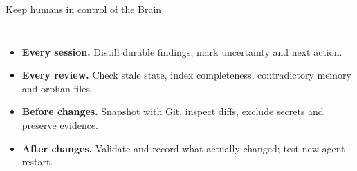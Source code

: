 \begin{frame}{Keep humans in control of the Brain}
\begin{columns}[c,onlytextwidth]
\begin{itemize}\setlength{\itemsep}{.48em}\small
\item \textbf{Every session.} Distill durable findings; mark uncertainty and next action.
\item \textbf{Every review.} Check stale state, index completeness, contradictory memory and orphan files.
\item \textbf{Before changes.} Snapshot with Git, inspect diffs, exclude secrets and preserve evidence.
\item \textbf{After changes.} Validate and record what actually changed; test new-agent restart.
\end{itemize}
\end{columns}
\medskip
{}
\end{frame}
